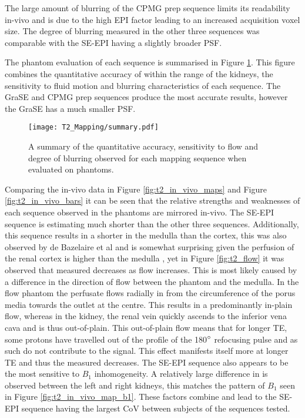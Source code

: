 The large amount of blurring of the \ac{CPMG} \ttwo prep sequence limits its readability in-vivo and is due to the high \ac{EPI} factor leading to an increased acquisition voxel size. The degree of blurring measured in the other three sequences was comparable with the \ac{SE}-\ac{EPI} having a slightly broader \ac{PSF}.

The phantom evaluation of each sequence is summarised in Figure \ref{fig:t2_summary}. This figure combines the quantitative accuracy of \ttwo within the range of the kidneys, the sensitivity to fluid motion and blurring characteristics of each sequence. The \ac{GraSE} and \ac{CPMG} \ttwo prep sequences produce the most accurate results, however the \ac{GraSE} has a much smaller \ac{PSF}.

\begin{figure}[H]
	\centering
	\texttt{[image: T2\_Mapping/summary.pdf]}
	\caption{A summary of the quantitative accuracy, sensitivity to flow and degree of blurring observed for each \ttwo mapping sequence when evaluated on phantoms.}
	\label{fig:t2_summary}	
\end{figure}

Comparing the in-vivo data in Figure \ref{fig:t2_in_vivo_maps} and Figure \ref{fig:t2_in_vivo_bars} it can be seen that the relative strengths and weaknesses of each sequence observed in the phantoms are mirrored in-vivo. The \ac{SE}-\ac{EPI} sequence is estimating much shorter \ttwo than the other three sequences. Additionally, this sequence results in a shorter \ttwo in the medulla than the cortex, this was also observed by de Bazelaire et al \cite{de_bazelaire_mr_2004} and is somewhat surprising given the perfusion of the renal cortex is higher than the medulla \cite{buchanan_quantitative_2019, nery_consensus-based_2020}, yet in Figure \ref{fig:t2_flow} it was observed that measured \ttwo decreases as flow increases. This is most likely caused by a difference in the direction of flow between the phantom and the medulla. In the flow phantom the perfusate flows radially in from the circumference  of the porus media towards the outlet at the centre. This results in a predominantly in-plain flow, whereas in the kidney, the renal vein quickly ascends to the inferior vena cava and is thus out-of-plain. This out-of-plain flow means that for longer \ac{TE}, some protons have travelled out of the profile of the 180$\degree$ refocusing pulse and as such do not contribute to the signal. This effect manifests itself more at longer \ac{TE} and thus the measured \ttwo decreases. The \ac{SE}-\ac{EPI} sequence also appears to be the most sensitive to $B_1$ inhomogeneity. A relatively large difference in \ttwo is observed between the left and right kidneys, this matches the pattern of $B_1$ seen in Figure \ref{fig:t2_in_vivo_map_b1}. These factors combine and lead to the \ac{SE}-\ac{EPI} sequence having the largest \ac{CoV} between subjects of the sequences tested.

